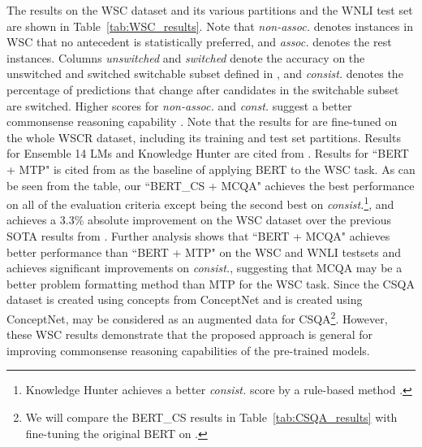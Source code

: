 \documentclass[11pt,a4paper]{article}
\begin{document}
The results on the WSC dataset and its various partitions and the WNLI test set are shown in Table~\ref{tab:WSC_results}. Note that \emph{non-assoc.} denotes instances in WSC that no antecedent is statistically preferred, and \emph{assoc.} denotes the rest instances. Columns \emph{unswitched} and \emph{switched} denote the accuracy on the unswitched and switched switchable subset defined in \citep{trichelair-etal-2019-reasonable}, and \emph{consist.} denotes the percentage of predictions that change after candidates in the switchable subset are switched. 
Higher scores for \emph{non-assoc.} and \emph{const.} suggest a better commonsense reasoning capability \citep{trichelair-etal-2019-reasonable}.
Note that the results for \citet{ruan2019exploring} are fine-tuned on the whole WSCR dataset, including its training and test set partitions.
Results for Ensemble 14 LMs \citep{trinh2018simple} and Knowledge Hunter\citep{emami2018knowledge} are cited from \citet{trichelair-etal-2019-reasonable}.
Results for ``BERT + MTP" is cited from \citet{kocijan2019surprisingly} as the baseline of applying BERT to the WSC task. 
As can be seen from the table, our ``BERT\_CS + MCQA" achieves the best performance on all of the evaluation criteria except being the second best on \emph{consist.}\footnote{Knowledge Hunter achieves a better \emph{consist.} score by a rule-based method \citep{trichelair-etal-2019-reasonable}.}, and achieves a 3.3\% absolute improvement on the WSC dataset over the previous SOTA results from \citet{kocijan2019surprisingly}. Further analysis shows that ``BERT + MCQA" achieves better performance than ``BERT + MTP" on the WSC and WNLI testsets and achieves significant improvements on \emph{consist.}, suggesting that MCQA may be a better problem formatting method than MTP for the WSC task. Since the CSQA dataset is created using concepts from ConceptNet and  is created using ConceptNet,  may be considered as an augmented data for CSQA\footnote{We will compare the BERT\_CS results in Table~\ref{tab:CSQA_results} with fine-tuning the original BERT on .}. However, these WSC results demonstrate that the proposed approach is general for improving commonsense reasoning capabilities of the pre-trained models.
\end{document}
